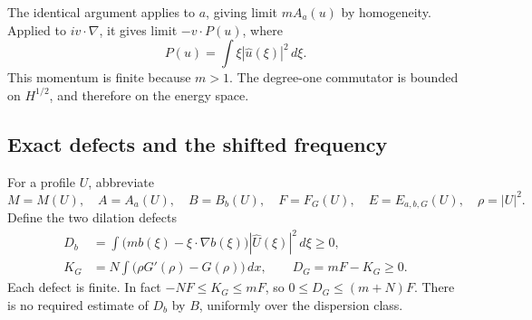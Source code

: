 The identical argument applies to \(a\), giving limit \(mA_a(u)\)
by homogeneity. Applied to \(iv\cdot\nabla\), it gives limit
\(-v\cdot P(u)\), where
\[
P(u)=\int \xi|\widehat u(\xi)|^2\,d\xi.
\]
This momentum is finite because \(m>1\). The degree-one
commutator is bounded on \(H^{1/2}\), and therefore on the
energy space.

\subsection{Exact defects and the shifted frequency}

For a profile \(U\), abbreviate
\[
M=M(U),\quad A=A_a(U),\quad B=B_b(U),\quad
F=F_G(U),\quad E=E_{a,b,G}(U),\quad \rho=|U|^2.
\]
Define the two dilation defects
\begin{align}
D_b&=\int\bigl(mb(\xi)-\xi\cdot\nabla b(\xi)\bigr)
|\widehat U(\xi)|^2\,d\xi\ge0,\label{cone:defect-b}\\
K_G&=N\int\bigl(\rho G'(\rho)-G(\rho)\bigr)\,dx,\qquad
D_G=mF-K_G\ge0.\label{cone:defect-G}
\end{align}
Each defect is finite. In fact
\(-NF\le K_G\le mF\), so \(0\le D_G\le(m+N)F\).
There is no required estimate of \(D_b\) by \(B\), uniformly
over the dispersion class.

